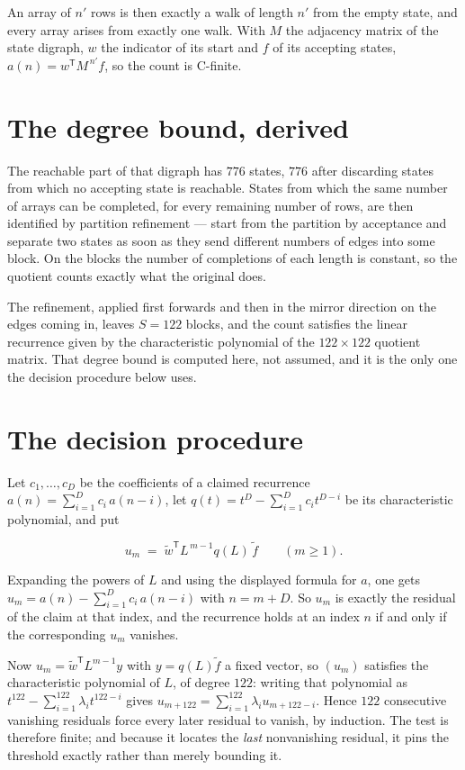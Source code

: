 \documentclass[11pt]{article}
\theoremstyle{definition}
\begin{document}
An array of $n'$ rows is then exactly a walk of length $n'$ from the empty state, and every array arises from exactly one walk. With $M$ the adjacency matrix of the state digraph, $w$ the indicator of its start and $f$ of its accepting states, $a(n) = w^{\mathsf T}M^{\,n'}f$, so the count is C-finite.

\section{The degree bound, derived}

The reachable part of that digraph has $776$ states, $776$ after discarding states from which no accepting state is reachable. States from which the same number of arrays can be completed, for every remaining number of rows, are then identified by partition refinement --- start from the partition by acceptance and separate two states as soon as they send different numbers of edges into some block. On the blocks the number of completions of each length is constant, so the quotient counts exactly what the original does.

The refinement, applied first forwards and then in the mirror direction on the edges coming in, leaves $S = 122$ blocks, and the count satisfies the linear recurrence given by the characteristic polynomial of the $122 \times 122$ quotient matrix. That degree bound is computed here, not assumed, and it is the only one the decision procedure below uses.

\section{The decision procedure}

Let $c_1,\dots,c_D$ be the coefficients of a claimed recurrence $a(n) = \sum_{i=1}^{D} c_i\,a(n-i)$, let $q(t) = t^{D} - \sum_{i=1}^{D} c_i t^{D-i}$ be its characteristic polynomial, and put

\[u_m \;=\; \tilde w^{\mathsf T} L^{\,m-1} q(L)\,\tilde f \qquad (m \ge 1).\]

Expanding the powers of $L$ and using the displayed formula for $a$, one gets $u_m = a(n) - \sum_{i=1}^{D} c_i\,a(n-i)$ with $n = m + D$. So $u_m$ is exactly the residual of the claim at that index, and the recurrence holds at an index $n$ if and only if the corresponding $u_m$ vanishes.

Now $u_m = \tilde w^{\mathsf T} L^{m-1} y$ with $y = q(L)\tilde f$ a fixed vector, so $(u_m)$ satisfies the characteristic polynomial of $L$, of degree $122$: writing that polynomial as $t^{122} - \sum_{i=1}^{122} \lambda_i t^{122-i}$ gives $u_{m+122} = \sum_{i=1}^{122} \lambda_i u_{m+122-i}$. Hence $122$ consecutive vanishing residuals force every later residual to vanish, by induction. The test is therefore finite; and because it locates the {\itshape last} nonvanishing residual, it pins the threshold exactly rather than merely bounding it.
\end{document}
